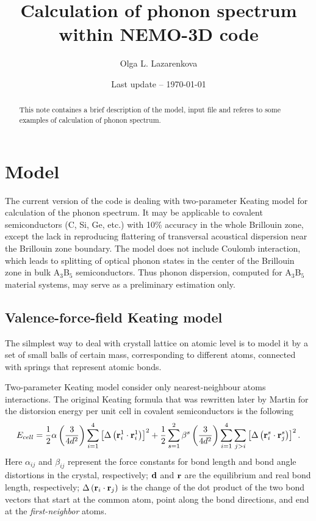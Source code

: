 \documentclass[12pt]{article}
\title{Calculation of phonon spectrum within NEMO-3D code}
\author{Olga L. Lazarenkova}
\date{Last update -- \today}
\begin{document}
\maketitle

\begin{abstract}
This note containes a brief description of  the model, input file  and
referes to some examples of calculation of phonon spectrum.
\end{abstract}

\section{Model}
The current version of the code is dealing with two-parameter Keating
model for calculation of the phonon spectrum. It may be applicable to
covalent semiconductors (C, Si, Ge, etc.)  with 10\% accuracy in the
whole Brillouin zone, except the lack in reproducing flattering of
transversal acoustical dispersion near the Brillouin zone
boundary. The model does not include Coulomb interaction, which leads
to splitting of optical phonon states in the center of the Brillouin
zone in bulk A$_3$B$_5$ semiconductors. Thus phonon dispersion,
computed for A$_3$B$_5$ material systems, may serve as a preliminary
estimation only.

\subsection{Valence-force-field Keating model}
The silmplest way to deal with crystall lattice on atomic level is to
model it by a set of small balls of certain mass, corresponding to
different atoms, connected with springs that represent atomic bonds.

Two-parameter Keating model consider only nearest-neighbour atoms
interactions. The original Keating \cite{Keating_VFFM} formula that
was rewritten later by Martin \cite{Martin_ZnS_VFFM} for the
distorsion energy per unit cell in covalent semiconductors is the
following
\begin{equation}
\label{E_cell}
E_{cell}=\frac{1}{2}\alpha\left({3\over4d^2}\right)\sum_{i=1}^4\left[\Delta\left({\bf r}_i^1\cdot{\bf r}_i^1\right)\right]^2+\frac{1}{2}\sum_{s=1}^2\beta^s\left({3\over4d^2}\right)\sum_{i=1}^4\sum_{j>i}\left[\Delta\left({\bf r}_i^s\cdot{\bf r}_j^s\right)\right]^2.
\end{equation}
Here $\alpha_{ij}$ and $\beta_{ij}$ represent the force constants for bond
length and bond angle distortions in the crystal, respectively;  ${\bf
d}$ and ${\bf r}$ are the equilibrium and real bond length,
respectively; $\Delta\left({\bf r}_i\cdot{\bf r}_j\right)$ is the
change of the dot product of the two bond vectors that start at the
common atom, point along the bond directions, and end at the
\textit{first-neighbor} atoms. 
\end{document}
